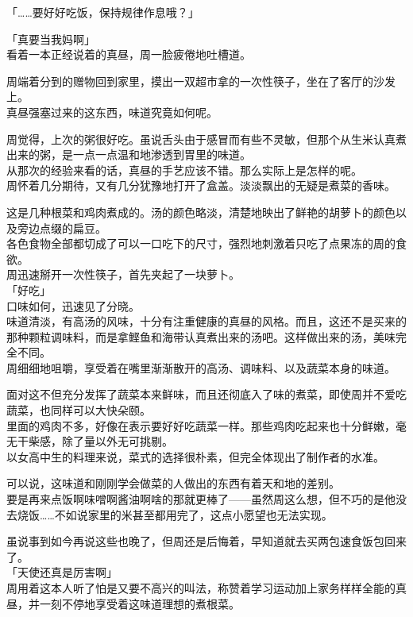 「……要好好吃饭，保持规律作息哦？」

「真要当我妈啊」\\

看着一本正经说着的真昼，周一脸疲倦地吐槽道。\\

\vspace{2\baselineskip}

周端着分到的赠物回到家里，摸出一双超市拿的一次性筷子，坐在了客厅的沙发上。\\

真昼强塞过来的这东西，味道究竟如何呢。

周觉得，上次的粥很好吃。虽说舌头由于感冒而有些不灵敏，但那个从生米认真煮出来的粥，是一点一点温和地渗透到胃里的味道。\\

从那次的经验来看的话，真昼的手艺应该不错。那么实际上是怎样的呢。\\

周怀着几分期待，又有几分犹豫地打开了盒盖。淡淡飘出的无疑是煮菜的香味。

这是几种根菜和鸡肉煮成的。汤的颜色略淡，清楚地映出了鲜艳的胡萝卜的颜色以及旁边点缀的扁豆。\\

各色食物全部都切成了可以一口吃下的尺寸，强烈地刺激着只吃了点果冻的周的食欲。\\

周迅速掰开一次性筷子，首先夹起了一块萝卜。\\

「好吃」\\

口味如何，迅速见了分晓。\\

味道清淡，有高汤的风味，十分有注重健康的真昼的风格。而且，这还不是买来的那种颗粒调味料，而是拿鲣鱼和海带认真煮出来的汤吧。这样做出来的汤，美味完全不同。\\

周细细地咀嚼，享受着在嘴里渐渐散开的高汤、调味料、以及蔬菜本身的味道。

面对这不但充分发挥了蔬菜本来鲜味，而且还彻底入了味的煮菜，即使周并不爱吃蔬菜，也同样可以大快朵颐。\\

里面的鸡肉不多，好像在表示要好好吃蔬菜一样。那些鸡肉吃起来也十分鲜嫩，毫无干柴感，除了量以外无可挑剔。\\

以女高中生的料理来说，菜式的选择很朴素，但完全体现出了制作者的水准。

可以说，这味道和刚刚学会做菜的人做出的东西有着天和地的差别。\\

要是再来点饭啊味噌啊酱油啊啥的那就更棒了——虽然周这么想，但不巧的是他没去烧饭……不如说家里的米甚至都用完了，这点小愿望也无法实现。

虽说事到如今再说这些也晚了，但周还是后悔着，早知道就去买两包速食饭包回来了。\\

「天使还真是厉害啊」\\

周用着这本人听了怕是又要不高兴的叫法，称赞着学习运动加上家务样样全能的真昼，并一刻不停地享受着这味道理想的煮根菜。
